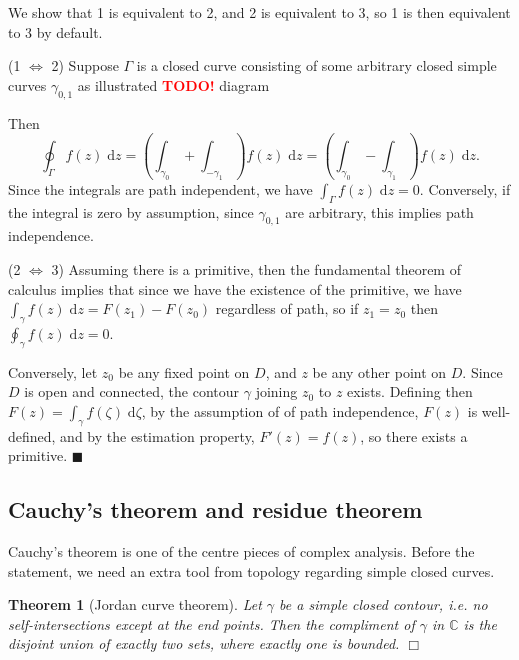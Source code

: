 \documentclass[letter-paper]{tufte-book}
\newcommand{\TODO}{\textcolor{red}{\bf TODO!}\xspace}
\newtheorem{theorem}{\color{pastel-blue}Theorem}[section]
\newenvironment{proof}[1][Proof]{\begin{trivlist}
\item[\hskip \labelsep {\bfseries #1}]}{\end{trivlist}}
\newcommand{\qed}{\hfill$\blacksquare$}
\newcommand{\qedwhite}{\hfill \ensuremath{\Box}}
\begin{document}
\begin{proof}
  We show that 1 is equivalent to 2, and 2 is equivalent to 3, so 1 is then
  equivalent to 3 by default.
  
  (1 $\Leftrightarrow$ 2) Suppose $\Gamma$ is a closed curve consisting of some
  arbitrary closed simple curves $\gamma_{0,1}$ as illustrated \TODO diagram
  
  Then
  \begin{equation*}
    \oint_\Gamma f(z)\; \mathrm{d}z = \left(\int_{\gamma_0} + \int_{-\gamma_1}\right) f(z)\; \mathrm{d}z = \left(\int_{\gamma_0} - \int_{\gamma_1}\right) f(z)\; \mathrm{d}z.
  \end{equation*}
  Since the integrals are path independent, we have $\int_{\Gamma} f(z)\;
  \mathrm{d}z = 0$. Conversely, if the integral is zero by assumption, since
  $\gamma_{0,1}$ are arbitrary, this implies path independence.
  
  (2 $\Leftrightarrow$ 3) Assuming there is a primitive, then the fundamental
  theorem of calculus implies that since we have the existence of the primitive,
  we have $\int_\gamma f(z)\; \mathrm{d}z = F(z_1) - F(z_0)$ regardless of path,
  so if $z_1 = z_0$ then $\oint_\gamma f(z)\; \mathrm{d}z = 0$.
  
  Conversely, let $z_0$ be any fixed point on $D$, and $z$ be any other point on
  $D$. Since $D$ is open and connected, the contour $\gamma$ joining $z_0$ to
  $z$ exists. Defining then $F(z) = \int_\gamma f(\zeta)\; \mathrm{d}\zeta$, by
  the assumption of of path independence, $F(z)$ is well-defined, and by the
  estimation property, $F'(z) = f(z)$, so there exists a primitive. \qed
\end{proof}


\subsection{Cauchy's theorem and residue theorem}

Cauchy's theorem is one of the centre pieces of complex analysis. Before the
statement, we need an extra tool from topology regarding simple closed curves.

\begin{theorem}[Jordan curve theorem]
  Let $\gamma$ be a simple closed contour, i.e. no self-intersections except at
  the end points. Then the compliment of $\gamma$ in $\mathbb{C}$ is the
  disjoint union of exactly two sets, where exactly one is bounded. \qedwhite
\end{theorem}
\end{document}
